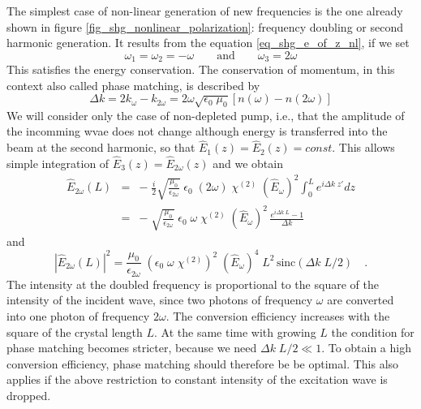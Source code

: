 The simplest case of non-linear generation of new frequencies
is the one already shown in figure \ref{fig_shg_nonlinear_polarization}: 
 frequency doubling or second harmonic generation. It results from the equation
\ref{eq_shg_e_of_z_nl}, if we set
\begin{equation}
  \omega_1 = \omega_2 = - \omega \qquad \text{and} \qquad
  \omega_3 = 2\omega
\end{equation}
This satisfies the energy conservation. The
conservation of momentum, in this context also called phase matching, is described by
\begin{equation}
 \Delta k = 2 k_{\omega} - k_{2 \omega} = 2 \omega
 \sqrt{\epsilon_0 \; \mu_0} \left[ n(\omega) - n(2 \omega) \right]
\end{equation}
We will consider only the case of non-depleted pump, i.e., that the amplitude of the incomming wvae does not change although energy is transferred into the beam at the second harmonic, so that
$\hat{E}_1(z) = \hat{E}_2(z)
= const$. This allows simple integration of $\hat{E}_3(z) = \hat{E}_{2\omega}(z)$
and we obtain
\begin{eqnarray}
 \hat{E}_{2\omega}(L) &=& - \; \frac{i}{2}   \sqrt{ \frac{\mu_0} {\epsilon_{2\omega}}}\;\epsilon_0
  \; (2 \omega) \; \chi^{(2)} \; (\hat{E}_{\omega})^2   \int_0^L  e^{i  \Delta k \;
  z'} dz  \\
  &= & %
- \;    \sqrt{ \frac{\mu_0} {\epsilon_{2\omega}}}\;\epsilon_0
  \;  \omega \; \chi^{(2)} \; (\hat{E}_{\omega})^2  \, \frac{  e^{i  \Delta k \;
  L} -1}{\Delta k}
\end{eqnarray}
and
\begin{equation}
  \left| \hat{E}_{2\omega}(L) \right|^2 = %
  \frac{\mu_0} {\epsilon_{2\omega}} \; \left(\epsilon_0
  \;  \omega \; \chi^{(2)} \right)^2 \; (\hat{E}_{\omega})^4  \; L^2 \, \text{sinc} ( \Delta k \; L /2 )
   \quad . \label{eq_shg_efficiency_shg}
\end{equation}
The intensity at the doubled frequency is proportional to
the square of the intensity of the incident wave, since two photons
of frequency $\omega$ are converted into one photon of frequency $2\omega$. The conversion efficiency increases with the
square of the crystal  length $L$. At the same time with 
growing $L$ the condition for phase matching becomes stricter, because we need 
$\Delta k \; L / 2 \ll 1 $. To obtain a high
conversion efficiency, phase matching should therefore be
be optimal. This also applies if the above restriction to
constant intensity of the excitation wave is dropped.

